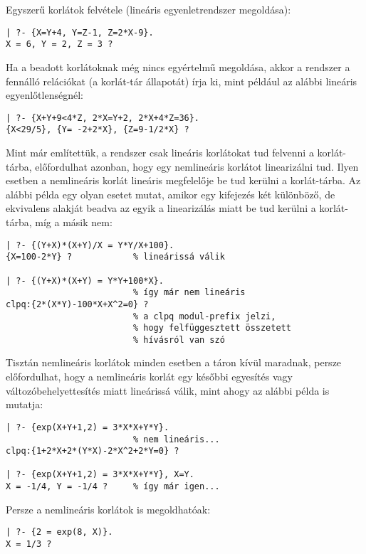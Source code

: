 Egyszerű korlátok felvétele (lineáris egyenletrendszer megoldása):

\begin{verbatim}
| ?- {X=Y+4, Y=Z-1, Z=2*X-9}.   
X = 6, Y = 2, Z = 3 ?
\end{verbatim}

Ha a beadott korlátoknak még nincs egyértelmű megoldása, akkor a
\clpq rendszer a fennálló relációkat (a korlát-tár állapotát)
írja ki, mint például az alábbi lineáris egyenlőtlenségnél:

\begin{verbatim}
| ?- {X+Y+9<4*Z, 2*X=Y+2, 2*X+4*Z=36}.  
{X<29/5}, {Y= -2+2*X}, {Z=9-1/2*X} ?    
\end{verbatim}

Mint már említettük, a \clpq rendszer csak lineáris korlátokat
tud felvenni a korlát-tárba, előfordulhat azonban, hogy egy nemlineáris
korlátot linearizálni tud. Ilyen esetben a nemlineáris korlát lineáris
megfelelője be tud kerülni a korlát-tárba. Az alábbi példa egy olyan esetet
mutat, amikor egy kifejezés két különböző, de ekvivalens alakját beadva az
egyik a linearizálás miatt be tud kerülni a korlát-tárba, míg a másik nem:

\begin{verbatim}
| ?- {(Y+X)*(X+Y)/X = Y*Y/X+100}.       
{X=100-2*Y} ?            % lineárissá válik

| ?- {(Y+X)*(X+Y) = Y*Y+100*X}.         
                         % így már nem lineáris
clpq:{2*(X*Y)-100*X+X^2=0} ?             
                         % a clpq modul-prefix jelzi,
                         % hogy felfüggesztett összetett
                         % hívásról van szó
\end{verbatim}

Tisztán nemlineáris korlátok minden esetben a táron kívül maradnak, persze
előfordulhat, hogy a nemlineáris korlát egy későbbi egyesítés vagy
változóbehelyettesítés miatt lineárissá válik, mint ahogy az alábbi
példa is mutatja:

\begin{verbatim}
| ?- {exp(X+Y+1,2) = 3*X*X+Y*Y}.        
                         % nem lineáris...
clpq:{1+2*X+2*(Y*X)-2*X^2+2*Y=0} ? 

| ?- {exp(X+Y+1,2) = 3*X*X+Y*Y}, X=Y.   
X = -1/4, Y = -1/4 ?     % így már igen...
\end{verbatim}

Persze a nemlineáris korlátok is megoldhatóak:

\begin{verbatim}
| ?- {2 = exp(8, X)}.
X = 1/3 ?
\end{verbatim}

